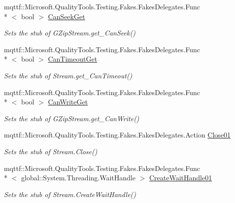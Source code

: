 \begin{DoxyCompactItemize}
mqttf\-::\-Microsoft.\-Quality\-Tools.\-Testing.\-Fakes.\-Fakes\-Delegates.\-Func\\*
$<$ bool $>$ \hyperlink{class_system_1_1_i_o_1_1_compression_1_1_fakes_1_1_stub_g_zip_stream_ae6a7634b38c7b10519f014a7ba3aab15}{Can\-Seek\-Get}
\begin{DoxyCompactList}\small\item\em Sets the stub of G\-Zip\-Stream.\-get\-\_\-\-Can\-Seek()\end{DoxyCompactList}\item 
mqttf\-::\-Microsoft.\-Quality\-Tools.\-Testing.\-Fakes.\-Fakes\-Delegates.\-Func\\*
$<$ bool $>$ \hyperlink{class_system_1_1_i_o_1_1_compression_1_1_fakes_1_1_stub_g_zip_stream_ac7e275cb8520a6c17b3da8e6799a83c4}{Can\-Timeout\-Get}
\begin{DoxyCompactList}\small\item\em Sets the stub of Stream.\-get\-\_\-\-Can\-Timeout()\end{DoxyCompactList}\item 
mqttf\-::\-Microsoft.\-Quality\-Tools.\-Testing.\-Fakes.\-Fakes\-Delegates.\-Func\\*
$<$ bool $>$ \hyperlink{class_system_1_1_i_o_1_1_compression_1_1_fakes_1_1_stub_g_zip_stream_ac42920830672fd33a261d3bec8b3e3d9}{Can\-Write\-Get}
\begin{DoxyCompactList}\small\item\em Sets the stub of G\-Zip\-Stream.\-get\-\_\-\-Can\-Write()\end{DoxyCompactList}\item 
mqttf\-::\-Microsoft.\-Quality\-Tools.\-Testing.\-Fakes.\-Fakes\-Delegates.\-Action \hyperlink{class_system_1_1_i_o_1_1_compression_1_1_fakes_1_1_stub_g_zip_stream_a3f31b867772b6e51270881976e54425c}{Close01}
\begin{DoxyCompactList}\small\item\em Sets the stub of Stream.\-Close()\end{DoxyCompactList}\item 
mqttf\-::\-Microsoft.\-Quality\-Tools.\-Testing.\-Fakes.\-Fakes\-Delegates.\-Func\\*
$<$ global\-::\-System.\-Threading.\-Wait\-Handle $>$ \hyperlink{class_system_1_1_i_o_1_1_compression_1_1_fakes_1_1_stub_g_zip_stream_aa3c6b4e76d21fcfa2cbbc624a8498d27}{Create\-Wait\-Handle01}
\begin{DoxyCompactList}\small\item\em Sets the stub of Stream.\-Create\-Wait\-Handle()\end{DoxyCompactList}\item 

\end{DoxyCompactItemize}
